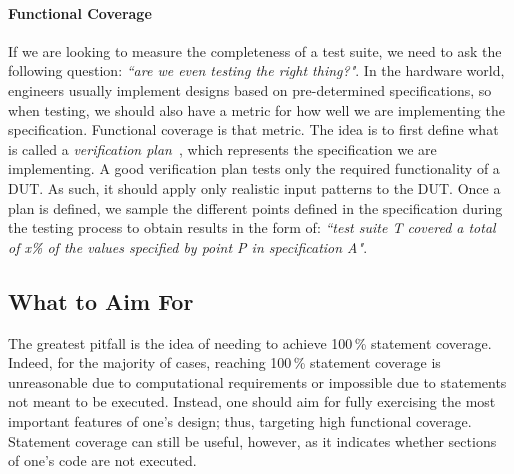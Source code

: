 \documentclass[conference]{IEEEtran}
\newcommand{\hjd}[1]{{\color{pink} Hans: #1}}
\begin{document}
%

\paragraph{Functional Coverage} If we are looking to measure the completeness of a test suite, we need to ask the following question: \textit{``are we even testing the right thing?"}. 
In the hardware world, engineers usually implement designs based on pre-determined specifications, so when testing, we should also have a metric for how well we are implementing the specification. 
Functional coverage is that metric. 
The idea is to first define what is called a \textit{verification plan}~\cite{spear2008systemverilog}, which represents the specification we are implementing. 
A good verification plan tests only the required functionality of a DUT. As such, it should apply only 
realistic input patterns to the DUT.
Once a plan is defined, we sample the different points defined in the specification during the testing process to obtain results in the form of: \textit{``test suite T covered a total of x\% of the values specified by point P in specification A"}. 

\subsection{What to Aim For}
The greatest pitfall is the idea of needing to achieve 100\,\% statement coverage. Indeed, for the majority of cases, reaching 100\,\% statement coverage is unreasonable due to computational requirements or impossible due to statements not meant to be executed. Instead, one should aim for fully exercising the most important features of one's design; thus, targeting high functional coverage. Statement coverage can still be useful, however, as it indicates whether sections of one's code are not executed. 
\end{document}
